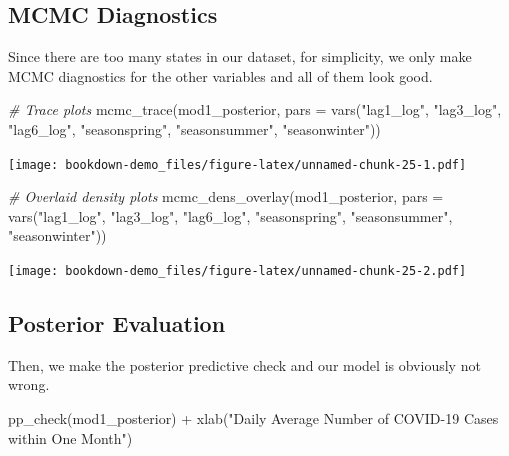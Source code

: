 \documentclass[
]{book}
\newenvironment{Shaded}{\begin{snugshade}}{\end{snugshade}}
\newcommand{\AttributeTok}[1]{\textcolor[rgb]{0.77,0.63,0.00}{#1}}
\newcommand{\CommentTok}[1]{\textcolor[rgb]{0.56,0.35,0.01}{\textit{#1}}}
\newcommand{\FunctionTok}[1]{\textcolor[rgb]{0.00,0.00,0.00}{#1}}
\newcommand{\NormalTok}[1]{#1}
\newcommand{\SpecialCharTok}[1]{\textcolor[rgb]{0.00,0.00,0.00}{#1}}
\newcommand{\StringTok}[1]{\textcolor[rgb]{0.31,0.60,0.02}{#1}}
\begin{document}
\hypertarget{mcmc-diagnostics}{%
\subsection{MCMC Diagnostics}\label{mcmc-diagnostics}}

Since there are too many states in our dataset, for simplicity, we only make MCMC diagnostics for the other variables and all of them look good.

\begin{Shaded}
\begin{Highlighting}[]
\CommentTok{\# Trace plots}
\FunctionTok{mcmc\_trace}\NormalTok{(mod1\_posterior, }\AttributeTok{pars =} \FunctionTok{vars}\NormalTok{(}\StringTok{"lag1\_log"}\NormalTok{, }\StringTok{"lag3\_log"}\NormalTok{, }\StringTok{"lag6\_log"}\NormalTok{, }\StringTok{"seasonspring"}\NormalTok{, }\StringTok{"seasonsummer"}\NormalTok{, }\StringTok{"seasonwinter"}\NormalTok{)) }
\end{Highlighting}
\end{Shaded}

\texttt{[image: bookdown-demo\_files/figure-latex/unnamed-chunk-25-1.pdf]}

\begin{Shaded}
\begin{Highlighting}[]
\CommentTok{\# Overlaid density plots}
\FunctionTok{mcmc\_dens\_overlay}\NormalTok{(mod1\_posterior, }\AttributeTok{pars =} \FunctionTok{vars}\NormalTok{(}\StringTok{"lag1\_log"}\NormalTok{, }\StringTok{"lag3\_log"}\NormalTok{, }\StringTok{"lag6\_log"}\NormalTok{, }\StringTok{"seasonspring"}\NormalTok{, }\StringTok{"seasonsummer"}\NormalTok{, }\StringTok{"seasonwinter"}\NormalTok{)) }
\end{Highlighting}
\end{Shaded}

\texttt{[image: bookdown-demo\_files/figure-latex/unnamed-chunk-25-2.pdf]}

\hypertarget{posterior-evaluation}{%
\subsection{Posterior Evaluation}\label{posterior-evaluation}}

Then, we make the posterior predictive check and our model is obviously not wrong.

\begin{Shaded}
\begin{Highlighting}[]
\FunctionTok{pp\_check}\NormalTok{(mod1\_posterior) }\SpecialCharTok{+} 
    \FunctionTok{xlab}\NormalTok{(}\StringTok{"Daily Average Number of COVID{-}19 Cases within One Month"}\NormalTok{)}
\end{Highlighting}
\end{Shaded}
\end{document}
